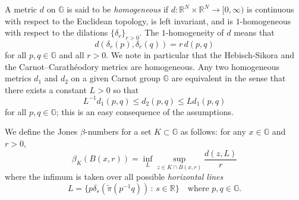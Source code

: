 \documentclass[11pt]{amsart}
\def\diam{{\rm diam\,}}
\theoremstyle{definition}
\newcommand{\G}{\mathbb G}
\newcommand{\ra}{\rightarrow}
\newcommand{\R}{\mathbb R}
\def\diam{\operatorname{diam}}
\numberwithin{theorem}{section} \numberwithin{equation}{section}
\begin{document}
 A metric $d$ on $\G$ is said to be {\it homogeneous} if $d: \R^N \times \R^N \ra [0,\infty)$ is
continuous with respect to the Euclidean topology, is left invariant,
and is $1$-homogeneous with respect to the dilations
$\{\delta_r\}_{r>0}$. The $1$-homogeneity of $d$ means that
$$
d(\delta_r(p),\delta_r(q)) = r\, d(p,q)
$$
for all $p,q\in\G$ and all
$r>0$. We note in particular that the Hebisch-Sikora  and the Carnot--Carath\'eodory metrics
are homogeneous.  Any two homogeneous metrics
$d_1$ and $d_2$ on a given Carnot group $\G$ are equivalent in the
sense that there exists a constant $L>0$ so that
\begin{equation}\label{quasiconvexity}
L^{-1}d_1(p,q) \le d_2(p,q) \le Ld_1(p,q)
\end{equation}
for all $p,q\in\G$; this is an easy
consequence of the assumptions.








We define the Jones $\beta$-numbers for a set $K \subset \mathbb{G}$ as follows: for any $x \in \G$ and $r>0$,
$$
\beta_K(B(x,r)) 
= \inf_L \sup_{z \in K \cap B(x,r)} \frac{d(z,L)}{r}
$$
where the infimum is taken over all possible \emph{horizontal lines}
$$
L = \{p \delta_s(\tilde{\pi}(p^{-1}q)) \, : \, s \in \mathbb{R}\} 
\quad \text{where } p,q \in \mathbb{G}.
$$
\end{document}
